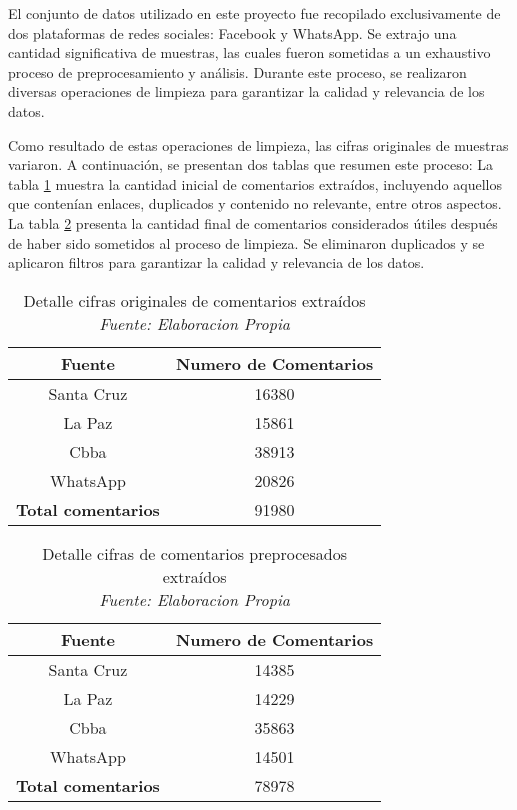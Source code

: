 El conjunto de datos utilizado en este proyecto fue recopilado exclusivamente de dos plataformas de redes sociales: Facebook y WhatsApp. Se extrajo una cantidad significativa de muestras, las cuales fueron sometidas a un exhaustivo proceso de preprocesamiento y análisis. Durante este proceso, se realizaron diversas operaciones de limpieza para garantizar la calidad y relevancia de los datos.

Como resultado de estas operaciones de limpieza, las cifras originales de muestras variaron. A continuación, se presentan dos tablas que resumen este proceso: La tabla \ref{tbl:14} muestra la cantidad inicial de comentarios extraídos, incluyendo aquellos que contenían enlaces, duplicados y contenido no relevante, entre otros aspectos. La tabla \ref{tbl:15} presenta la cantidad final de comentarios considerados útiles después de haber sido sometidos al proceso de limpieza. Se eliminaron duplicados y se aplicaron filtros para garantizar la calidad y relevancia de los datos.

\begin{table}[!ht]
	\centering
	\begin{tabular}{|c|c|}
		\hline
		\textbf{Fuente} & \textbf{Numero de Comentarios} \\ \hline
		Santa Cruz & 16380 \\ 
		La Paz & 15861 \\ 
		Cbba & 38913 \\ 
		WhatsApp & 20826 \\ \hline
		\textbf{Total comentarios} & 91980 \\ \hline
	\end{tabular}
	\caption[Detalle cifras originales de comentarios extraídos]{Detalle cifras originales de comentarios extraídos
		\\\textit{Fuente: Elaboracion Propia}}
	\label{tbl:14}
\end{table}

\begin{table}[!ht]
	\centering
	\begin{tabular}{|c|c|}
		\hline
		\textbf{Fuente} & \textbf{Numero de Comentarios} \\ \hline
		Santa Cruz & 14385 \\ 
		La Paz & 14229 \\ 
		Cbba & 35863 \\ 
		WhatsApp & 14501 \\ \hline
		\textbf{Total comentarios} & 78978 \\ \hline
	\end{tabular}
	\caption[Detalle cifras de comentarios preprocesados extraídos]{Detalle cifras de comentarios preprocesados extraídos
		\\\textit{Fuente: Elaboracion Propia}}
	\label{tbl:15}
\end{table}

